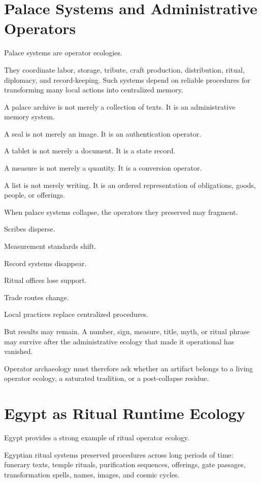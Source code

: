\documentclass[11pt]{book}
\begin{document}
\section{Palace Systems and Administrative Operators}

Palace systems are operator ecologies.

They coordinate labor, storage, tribute, craft production, distribution, ritual, diplomacy, and record-keeping. Such systems depend on reliable procedures for transforming many local actions into centralized memory.

A palace archive is not merely a collection of texts. It is an administrative memory system.

A seal is not merely an image. It is an authentication operator.

A tablet is not merely a document. It is a state record.

A measure is not merely a quantity. It is a conversion operator.

A list is not merely writing. It is an ordered representation of obligations, goods, people, or offerings.

When palace systems collapse, the operators they preserved may fragment.

Scribes disperse.

Measurement standards shift.

Record systems disappear.

Ritual offices lose support.

Trade routes change.

Local practices replace centralized procedures.

But results may remain. A number, sign, measure, title, myth, or ritual phrase may survive after the administrative ecology that made it operational has vanished.

Operator archaeology must therefore ask whether an artifact belongs to a living operator ecology, a saturated tradition, or a post-collapse residue.

\section{Egypt as Ritual Runtime Ecology}

Egypt provides a strong example of ritual operator ecology.

Egyptian ritual systems preserved procedures across long periods of time: funerary texts, temple rituals, purification sequences, offerings, gate passages, transformation spells, names, images, and cosmic cycles.
\end{document}

